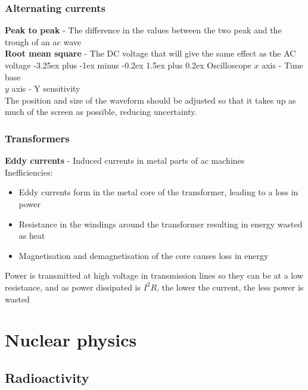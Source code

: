 \documentclass[12pt]{article}
\makeatletter
\renewcommand{\paragraph}{\@startsection{paragraph}{4}{0ex}%
    {-3.25ex plus -1ex minus -0.2ex}%
    {1.5ex plus 0.2ex}%
    {\normalfont\normalsize\bfseries}}
\makeatother
\begin{document}
\subsubsection{Alternating currents}
\textbf{Peak to peak} - The difference in the values between the two peak and the trough of an ac wave\\
\textbf{Root mean square} - The DC voltage that will give the same effect as the AC voltage
\paragraph{Oscilloscope}
$x$ axis - Time base\\
$y$ axis - Y sensitivity\\
The position and size of the waveform should be adjusted so that it takes up as much of the screen as possible, reducing uncertainty.
\subsubsection{Transformers}
\textbf{Eddy currents} - Induced currents in metal parts of ac machines\\
Inefficiencies:
\begin{itemize}
\item Eddy currents form in the metal core of the transformer, leading to a loss in power
\item Resistance in the windings around the transformer resulting in energy wasted as heat
\item Magnetisation and demagnetisation of the core causes loss in energy
\end{itemize}
Power is transmitted at high voltage in transmission lines so they can be at a low resistance, and as power dissipated is $I^2R$, the lower the current, the less power is wasted
\section{Nuclear physics}
\subsection{Radioactivity}
\end{document}

